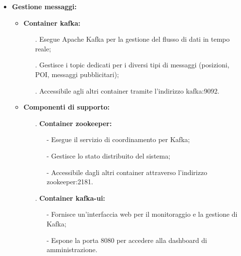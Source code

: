 \documentclass[10pt]{article}
\begin{document}
\begin{itemize}
    \item \textbf{Gestione messaggi:}
    \begin{itemize}
        \item \textbf{Container kafka:}
        \begin{itemize}
            \item[.] Esegue Apache Kafka per la gestione del flusso di dati in tempo reale;
            \item[.] Gestisce i topic dedicati per i diversi tipi di messaggi (posizioni, POI, messaggi pubblicitari);
            \item[.] Accessibile agli altri container tramite l'indirizzo kafka:9092.
        \end{itemize}
        \item \textbf{Componenti di supporto:}
        \begin{itemize}
            \item[.] \textbf{Container zookeeper:}
            \begin{itemize}
                \item[-] Esegue il servizio di coordinamento per Kafka;
                \item[-] Gestisce lo stato distribuito del sistema;
                \item[-] Accessibile dagli altri container attraverso l'indirizzo zookeeper:2181.
            \end{itemize}
            \item[.] \textbf{Container kafka-ui:}
            \begin{itemize}
                \item[-] Fornisce un'interfaccia web per il monitoraggio e la gestione di Kafka;
                \item[-] Espone la porta 8080 per accedere alla dashboard di amministrazione.
            \end{itemize}
        \end{itemize}
    \end{itemize}


\end{itemize}
\end{document}
